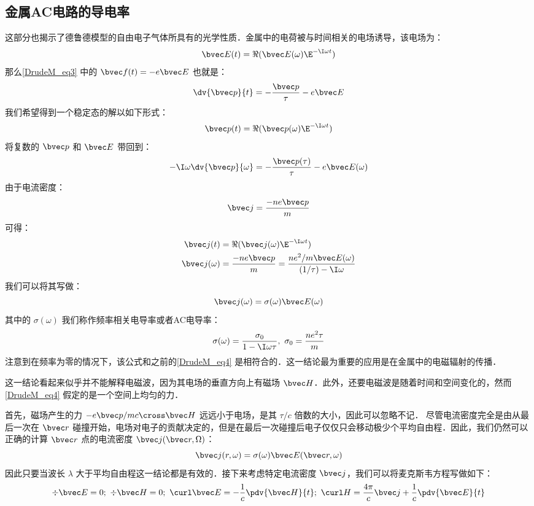 \subsection{金属AC电路的导电率}
这部分也揭示了德鲁德模型的自由电子气体所具有的光学性质．金属中的电荷被与时间相关的电场诱导，该电场为：
\begin{equation}
\bvec E(t)=\Re(\bvec E(\omega)\E^{-\I\omega t})
\end{equation}
那么\autoref{DrudeM_eq3} 中的 $\bvec f(t)=-e\bvec E$ 也就是：
\begin{equation}
\dv{\bvec p}{t}=-\frac{\bvec p}{\tau}-e\bvec E
\end{equation}
我们希望得到一个稳定态的解以如下形式：
\begin{equation}
\bvec p(t)=\Re(\bvec p(\omega)\E^{-\I\omega t})
\end{equation}
将复数的 $\bvec p$ 和 $\bvec E$ 带回到：
\begin{equation}
-\I\omega\dv{\bvec p}{\omega}=-\frac{\bvec p(\tau)}{\tau}-e\bvec E(\omega)
\end{equation}
由于电流密度：
\begin{equation}
\bvec j = \frac{-ne\bvec p}{m}
\end{equation}
可得：
\begin{align}
\bvec j(t)&=\Re(\bvec j(\omega)\E^{-\I\omega t})\\
\bvec j(\omega)&=\frac{-ne\bvec p}{m}=\frac{ne^2/m\bvec E(\omega)}{(1/\tau)-\I\omega}
\end{align}
我们可以将其写做：
\begin{equation}
\bvec j(\omega)=\sigma(\omega)\bvec E(\omega)
\end{equation}
其中的 $\sigma(\omega)$ 我们称作频率相关电导率或者AC电导率：
\begin{equation}
\sigma(\omega)=\frac{\sigma_0}{1-\I\omega\tau},\ \sigma_0=\frac{ne^2\tau}{m}
\end{equation}
注意到在频率为零的情况下，该公式和之前的\autoref{DrudeM_eq4} 是相符合的．这一结论最为重要的应用是在金属中的电磁辐射的传播．

这一结论看起来似乎并不能解释电磁波，因为其电场的垂直方向上有磁场 $\bvec H$．此外，还要电磁波是随着时间和空间变化的，然而\autoref{DrudeM_eq4} 假定的是一个空间上均匀的力．

首先，磁场产生的力 $-e\bvec p/mc\cross \bvec H$ 远远小于电场，是其 $\tau/c$ 倍数的大小，因此可以忽略不记．
尽管电流密度完全是由从最后一次在 $\bvec r$ 碰撞开始，电场对电子的贡献决定的，但是在最后一次碰撞后电子仅仅只会移动极少个平均自由程．因此，我们仍然可以正确的计算 $\bvec r$ 点的电流密度 $\bvec j(\bvec r,\Omega)$：
\begin{equation}
\bvec j(r,\omega)=\sigma(\omega)\bvec E(\bvec r,\omega)
\end{equation}
因此只要当波长 $\lambda$ 大于平均自由程这一结论都是有效的．接下来考虑特定电流密度 $\bvec j$，我们可以将麦克斯韦方程写做如下：
\begin{equation}
\div \bvec E =0;\ \div \bvec H = 0;\ \curl \bvec E =-\frac{1}{c}\pdv{ \bvec H}{t};\ \curl H = \frac{4\pi}{c}\bvec j+\frac{1}{c}\pdv{ \bvec E}{t}
\end{equation}

